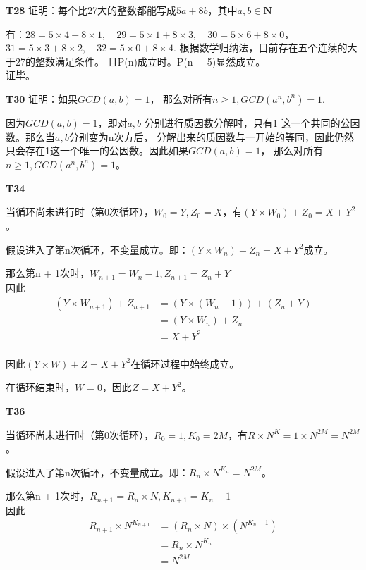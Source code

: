 \documentclass{article}
\begin{document}
\vspace{10pt}

\textbf{T28} 证明：每个比27大的整数都能写成$5a+8b$，其中$a, b \in \textbf{N}$

有：$28 = 5 \times 4 + 8 \times 1, \quad 29 = 5 \times 1 + 8 \times 3, \quad 30 = 5 \times 6 + 8 \times 0$，\\ 
$31 = 5 \times 3 + 8 \times 2, \quad 32 = 5 \times 0 + 8 \times 4$.
根据数学归纳法，目前存在五个连续的大于27的整数满足条件。
且P(n)成立时。P(n + 5)显然成立。\\
证毕。

\vspace{10pt}

\textbf{T30} 证明：如果$GCD(a, b) = 1$， 那么对所有$n \geq 1, GCD(a^n, b^n) = 1$.

因为$GCD(a, b) = 1$，即对$a, b$ 分别进行质因数分解时，只有1 这一个共同的公因数。那么当$a, b$分别变为n次方后，
分解出来的质因数与一开始的等同，因此仍然只会存在1这一个唯一的公因数。因此如果$GCD(a, b) = 1$， 那么对所有$n \geq 1, GCD(a^n, b^n) = 1$。

\vspace{10pt}

\textbf{T34}

当循环尚未进行时（第0次循环），$W_0 = Y, Z_0 = X$，有$(Y \times W_0) + Z_0 = X + Y^2$。

假设进入了第n次循环，不变量成立。即：$(Y \times W_n) + Z_n = X + Y^2$成立。

那么第n + 1次时，$W_{n + 1} = W_n - 1, Z_{n + 1} = Z_n + Y$\\
因此
\begin{align*}
    (Y \times W_{n + 1}) + Z_{n + 1} &= (Y \times (W_n - 1)) + (Z_n + Y)\\
    &= (Y \times W_n) + Z_n\\
    &= X + Y^2\\
\end{align*}

因此$(Y \times W) + Z = X + Y^2$在循环过程中始终成立。

在循环结束时，$W = 0$，因此$Z = X + Y^2$。

\vspace{10pt}

\textbf{T36}

当循环尚未进行时（第0次循环），$R_0 = 1, K_0 = 2M$，有$R \times N^K = 1 \times N^{2M} = N^{2M}$。

假设进入了第n次循环，不变量成立。即：$R_n \times N^{K_n} = N^{2M}$。

那么第n + 1次时，$R_{n + 1} = R_n \times N, K_{n + 1} = K_n - 1$\\
因此
\begin{align*}
    R_{n + 1} \times N^{K_{n+1}} &= (R_n \times N) \times (N^{K_n - 1})\\
    &= R_n \times N^{K_n}\\
    &=N^{2M}\\
\end{align*}
\end{document}
